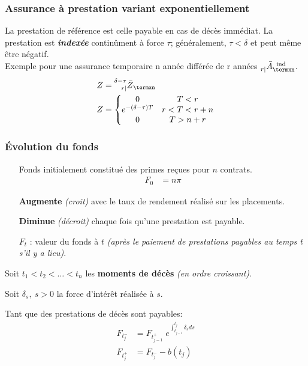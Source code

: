 \documentclass[10pt, french]{article}
\begin{document}
\begin{multicols*}{3}
\subsubsection*{\textcolor{amber(sae/ece)}{Assurance à prestation variant exponentiellement}}

La prestation de référence est celle payable en cas de décès immédiat.
La prestation est \textbf{\textit{indexée}} continûment à force $\tau$; généralement, $\tau < \delta$ et peut même être négatif.\\
Exemple pour une assurance temporaire n année différée de r années $\prescript{}{r|}{\bar{A}}_{\termxn}^{\;\; \text{ind}}$.\\
\begin{align*}
	Z &= \prescript{\delta - \tau}{r|}{\bar{Z}}_{\termxn}\\
	Z &= \left\{
	\begin{matrix}
		0	&	T < r \\
		e^{-(\delta - \tau) T}	&	r < T < r + n \\
		0	&	T > n + r
	\end{matrix}
	\right.
\end{align*}

\subsubsection*{\textcolor{amber(sae/ece)}{Évolution du fonds}}

\begin{enumerate}
\item[] Fonds initialement constitué des primes reçues pour $n$ contrats.
\begin{align*}
	F_{0} &= n \pi
\end{align*}
\item[\textbf{Augmente}] \textit{(croit)} avec le taux de rendement réalisé sur les placements.
\item[\textbf{Diminue}] \textit{(décroit)} chaque fois qu'une prestation est payable.
\item[$F_{t}$] : valeur du fonds à $t$ \textit{(après le paiement de prestations payables au temps t s'il y a lieu)}.
\end{enumerate}

Soit $t_1 < t_2 < \dots < t_n$ les \textbf{moments de décès} \textit{(en ordre croissant)}. 

Soit $\delta_s, \ s > 0$ la force d'intérêt réalisée à $s$.

Tant que des prestations de décès sont payables:
\begin{align*}
	F_{t_j^{-}} &= F_{t_{j-1}^{+}} \; e^{\int_{t_{j-1}}^{t_j} \delta_s ds} \\
	F_{t_j^{+}} &= F_{t_j^{-}} - b(t_j)
\end{align*}


\end{multicols*}
\end{document}
